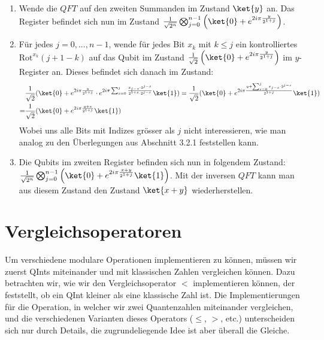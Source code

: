 \begin{enumerate}
    \item Wende die $QFT$ auf den zweiten Summanden im Zustand $\ket{y}$ an. Das Register befindet sich nun im Zustand $\frac{1}{\sqrt{2^n}}\bigotimes_{j = 0}^{n - 1}\left(\ket{0} + e^{2i\pi\frac{y}{2^{1 + j}}}\right)$.
    \item Für jedes $j = 0, ..., n - 1$, wende für jedes Bit $x_k$ mit $k \leq j$ ein kontrolliertes $\text{Rot}^{x_k}(j + 1 - k)$ auf das Qubit im Zustand $\frac{1}{\sqrt{2}}\left(\ket{0} + e^{2i\pi\frac{y}{2^{1 + j}}}\right)$ im $y$-Register an. Dieses befindet sich danach im Zustand:
    \begin{align*}
        &\frac{1}{\sqrt{2}}(\ket{0} + e^{2i\pi\frac{y}{2^{1 + j}}}\cdot e^{2i\pi\sum_{s = 0}^{j}\frac{x_{j - s}\cdot 2^{j - s}}{2^{1 + s}\cdot2^{j - s}}}\ket{1}) 
        = \frac{1}{\sqrt{2}}(\ket{0} + e^{2i\pi\frac{y + \sum_{s = 0}^{j}{x_{j - s}\cdot2^{j - s}}}{2^{1 + j}}}\ket{1}) \\ = &\frac{1}{\sqrt{2}}(\ket{0} + e^{2i\pi\frac{y + x}{2^{1 + j}}}\ket{1})
    \end{align*}
    Wobei uns alle Bits mit Indizes grösser als $j$ nicht interessieren, wie man analog zu den Überlegungen aus Abschnitt 3.2.1 feststellen kann.
    \item Die Qubits im zweiten Register befinden sich nun in folgendem Zustand: $\frac{1}{\sqrt{2^n}}\bigotimes_{j = 0}^{n - 1}\left(\ket{0} + e^{2i\pi\frac{x + y}{2^{1 + j}}}\ket{1}\right)$. Mit der inversen $QFT$ kann man aus diesem Zustand den Zustand $\ket{x + y}$ wiederherstellen.
\end{enumerate}

\section{Vergleichsoperatoren}
Um verschiedene modulare Operationen implementieren zu können, müssen wir zuerst QInts miteinander und mit klassischen Zahlen vergleichen können. Dazu betrachten wir, wie wir den Vergleichsoperator $<$ implementieren können, der feststellt, ob ein QInt kleiner als eine klassische Zahl ist. Die Implementierungen für die Operation, in welcher wir zwei Quantenzahlen miteinander vergleichen, und die verschiedenen Varianten dieses Operators ($\leq$, $>$, etc.) unterscheiden sich nur durch Details, die zugrundeliegende Idee ist aber überall die Gleiche.
\paragraph{}

